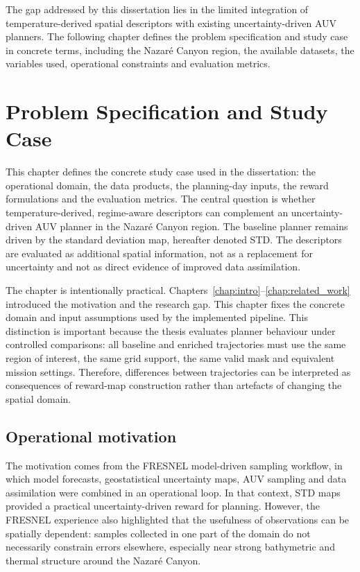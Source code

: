 The gap addressed by this dissertation lies in the limited integration of temperature-derived spatial descriptors with existing uncertainty-driven AUV planners. The following chapter defines the problem specification and study case in concrete terms, including the Nazaré Canyon region, the available datasets, the variables used, operational constraints and evaluation metrics.



\chapter{Problem Specification and Study Case} \label{chap:problem_specification}

This chapter defines the concrete study case used in the dissertation: the operational domain, the data products, the planning-day inputs, the reward formulations and the evaluation metrics. The central question is whether temperature-derived, regime-aware descriptors can complement an uncertainty-driven AUV planner in the Nazar\'e Canyon region. The baseline planner remains driven by the standard deviation map, hereafter denoted STD. The descriptors are evaluated as additional spatial information, not as a replacement for uncertainty and not as direct evidence of improved data assimilation.

The chapter is intentionally practical. Chapters~\ref{chap:intro}--\ref{chap:related_work} introduced the motivation and the research gap. This chapter fixes the concrete domain and input assumptions used by the implemented pipeline. This distinction is important because the thesis evaluates planner behaviour under controlled comparisons: all baseline and enriched trajectories must use the same region of interest, the same grid support, the same valid mask and equivalent mission settings. Therefore, differences between trajectories can be interpreted as consequences of reward-map construction rather than artefacts of changing the spatial domain.

\section{Operational motivation}

The motivation comes from the FRESNEL model-driven sampling workflow, in which model forecasts, geostatistical uncertainty maps, AUV sampling and data assimilation were combined in an operational loop. In that context, STD maps provided a practical uncertainty-driven reward for planning. However, the FRESNEL experience also highlighted that the usefulness of observations can be spatially dependent: samples collected in one part of the domain do not necessarily constrain errors elsewhere, especially near strong bathymetric and thermal structure around the Nazar\'e Canyon.

